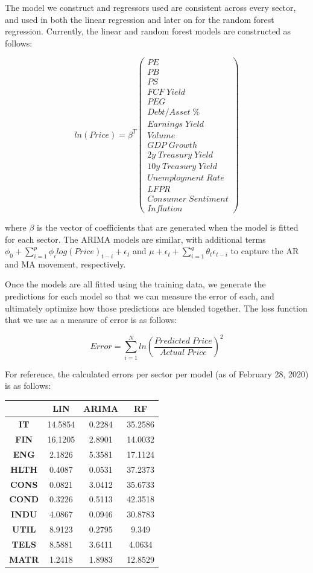 \documentclass[]{article}
\begin{document}
The model we construct and regressors used are consistent across every
sector, and used in both the linear regression and later on for the
random forest regression. Currently, the linear and random forest models
are constructed as follows:

\[
ln(Price) = \beta^T
\begin{pmatrix}
PE \\
PB \\
PS \\
FCF\;Yield \\
PEG \\
Debt/Asset\; \% \\
Earnings\; Yield \\
Volume \\
GDP\; Growth \\
2y\; Treasury\; Yield \\
10y\; Treasury\; Yield \\
Unemployment\; Rate \\
LFPR \\
Consumer\; Sentiment \\
Inflation
\end{pmatrix}
\]

where \(\beta\) is the vector of coefficients that are generated when
the model is fitted for each sector. The ARIMA models are similar, with
additional terms
\(\phi_0+\sum_{i=1}^{p}{\phi_i log(Price)_{t-i}+\epsilon_t}\) and
\(\mu+\epsilon_t+\sum_{i=1}^{q}{\theta_t\epsilon_{t-i}}\) to capture the
AR and MA movement, respectively.

Once the models are all fitted using the training data, we generate the
predictions for each model so that we can measure the error of each, and
ultimately optimize how those predictions are blended together. The loss
function that we use as a measure of error is as follows:

\[Error = \sum_{i=1}^{N} ln(\frac{Predicted\; Price}{Actual\; Price})^2\]

For reference, the calculated errors per sector per model (as of
February 28, 2020) is as follows:

\begin{longtable}[]{@{}cccc@{}}
\toprule
& LIN & ARIMA & RF\tabularnewline
\midrule
\endhead
\textbf{IT} & 14.5854 & 0.2284 & 35.2586\tabularnewline
\textbf{FIN} & 16.1205 & 2.8901 & 14.0032\tabularnewline
\textbf{ENG} & 2.1826 & 5.3581 & 17.1124\tabularnewline
\textbf{HLTH} & 0.4087 & 0.0531 & 37.2373\tabularnewline
\textbf{CONS} & 0.0821 & 3.0412 & 35.6733\tabularnewline
\textbf{COND} & 0.3226 & 0.5113 & 42.3518\tabularnewline
\textbf{INDU} & 4.0867 & 0.0946 & 30.8783\tabularnewline
\textbf{UTIL} & 8.9123 & 0.2795 & 9.349\tabularnewline
\textbf{TELS} & 8.5881 & 3.6411 & 4.0634\tabularnewline
\textbf{MATR} & 1.2418 & 1.8983 & 12.8529\tabularnewline
\bottomrule
\end{longtable}
\end{document}
